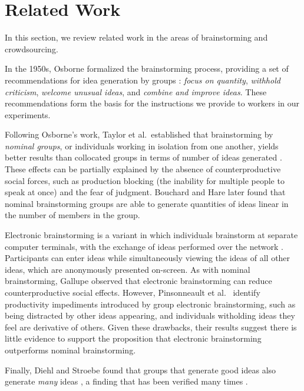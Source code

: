 \section{Related Work}
In this section, we review related work in the areas of brainstorming and crowdsourcing.

In the 1950s, Osborne formalized the brainstorming process, providing a set of recommendations for idea generation by groups \cite{osborn_applied_1957}: \emph{focus on quantity}, \emph{withhold criticism}, \emph{welcome unusual ideas}, and \emph{combine and improve ideas}. These recommendations form the basis for the instructions we provide to workers in our experiments.

Following Osborne's work, Taylor et al.\ established that brainstorming by \emph{nominal groups}, or individuals working in isolation from one another, yields better results than collocated groups in terms of number of ideas generated \cite{taylor_does_1958}. These effects can be partially explained by the absence of counterproductive social forces, such as production blocking (the inability for multiple people to speak at once) and the fear of judgment. Bouchard and Hare \cite{bouchard_jr_size_1970} later found that nominal brainstorming groups are able to generate quantities of ideas linear in the number of members in the group.

Electronic brainstorming is a variant in which individuals brainstorm at separate computer terminals, with the exchange of ideas performed over the network \cite{gallupe_electronic_1992}. Participants can enter ideas while simultaneously viewing the ideas of all other ideas, which are anonymously presented on-screen. As with nominal brainstorming, Gallupe \cite{gallupe_electronic_1992} observed that electronic brainstorming can reduce counterproductive social effects. However, Pinsonneault et al.\ \cite{pinsonneault_electronic_1999} identify productivity impediments introduced by group electronic brainstorming, such as being distracted by other ideas appearing, and individuals witholding ideas they feel are derivative of others. Given these drawbacks, their results suggest there is little evidence to support the proposition that electronic brainstorming outperforms nominal brainstorming.

Finally, Diehl and Stroebe found that groups that generate good ideas also generate \emph{many} ideas \cite{diehl_productivity_1987}, a finding that has been verified many times \cite{briggs1997quality, parnes1959effects, parnes_effects_1961, shah2003metrics, cross1996creativity}.

